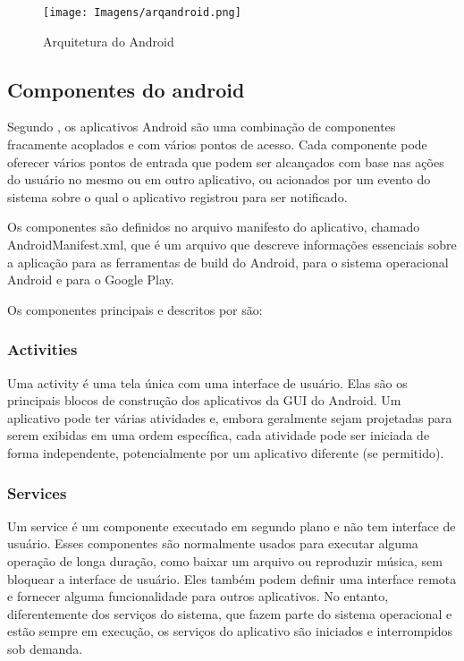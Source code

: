     \begin{figure}[H]
    \centering 
    \texttt{[image: Imagens/arqandroid.png]} 
    \caption{Arquitetura do Android}
    \label{android}
    \cite{Doc2024}
    \end{figure}

    
    \subsection{Componentes do android}
    Segundo , os aplicativos Android são uma combinação de componentes fracamente acoplados e com vários pontos de acesso. Cada componente pode oferecer vários pontos de entrada que podem ser alcançados com base nas ações do usuário no mesmo ou em outro aplicativo, ou acionados por um evento do sistema sobre o qual o aplicativo registrou para ser notificado.

    Os componentes são definidos no arquivo manifesto do aplicativo, chamado AndroidManifest.xml, que é um arquivo que descreve informações essenciais sobre a aplicação para as ferramentas de build do Android, para o sistema operacional Android e para o Google Play. 
    
    Os componentes principais e descritos por  são:

    \subsubsection{Activities}
    Uma activity é uma tela única com uma interface de usuário. Elas são os principais blocos de construção dos aplicativos da GUI do Android. Um aplicativo pode ter várias atividades e, embora geralmente sejam projetadas para serem exibidas em uma ordem específica, cada atividade pode ser iniciada de forma independente, potencialmente por um aplicativo diferente (se permitido).
    
    \subsubsection{Services}
    Um service é um componente executado em segundo plano e não tem interface de usuário. Esses componentes são normalmente usados para executar alguma operação de longa duração, como baixar um arquivo ou reproduzir música, sem bloquear a interface de usuário. Eles também podem definir uma interface remota e fornecer alguma funcionalidade para outros aplicativos. No entanto, diferentemente dos serviços do sistema, que fazem parte do sistema operacional e estão sempre em execução, os serviços do aplicativo são iniciados e interrompidos sob demanda.
    
